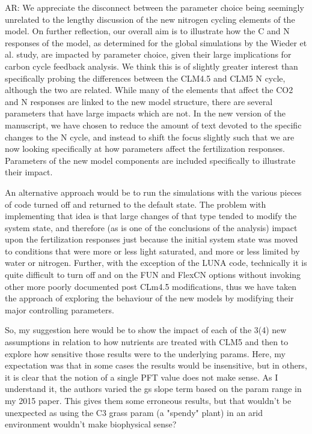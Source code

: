 \documentclass{article}
\begin{document}
\textsf{AR: We appreciate the disconnect between the parameter choice being seemingly unrelated to the lengthy discussion of the new nitrogen cycling elements of the model. On further reflection,  our overall aim is to illustrate how the C and N responses of the model, as determined for the global simulations by the Wieder et al. study, are impacted by parameter choice, given their large implications for carbon cycle feedback analysis. We think this is of slightly greater interest than specifically probing the differences between the CLM4.5 and CLM5 N cycle, although the two are related.   While many of the elements that affect the CO2 and N responses are linked to the new model structure, there are several parameters that have large impacts which are not. In the new version of the manuscript, we have chosen to reduce the amount of text devoted to the specific changes to the N cycle, and instead to shift the focus slightly such that we are now looking specifically at how parameters affect the fertilization responses. Parameters of the new model components are included specifically to illustrate their impact. }

\textsf{An alternative approach would be to run the simulations with the various pieces of code turned off and returned to the default state. The problem with implementing that idea is that large changes of that type tended to modify the system state, and therefore (as is one of the conclusions of the analysis) impact upon the fertilization responses just because the initial system state was moved to conditions that were more or less light saturated, and more or less limited by water or nitrogen. Further, with the exception of the LUNA code, technically it is quite difficult to turn off and on the FUN and FlexCN options without invoking other more poorly documented post CLm4.5 modifications, thus we have taken the approach of exploring the behaviour of the new models by modifying their major controlling parameters.}

So, my suggestion here would be to show the impact of each of the 3(4) new assumptions in relation to how nutrients are treated with CLM5 and then to explore how sensitive those results were to the underlying params. Here, my expectation was that in some cases the results would be insensitive, but in others, it is clear that the notion of a single PFT value does not make sense. As I understand it, the authors varied the gs slope term based on the param range in my 2015 paper. This gives them some erroneous results, but that wouldn't be unexpected as using the C3 grass param (a "spendy" plant) in an arid environment wouldn't make biophysical sense?
\end{document}
